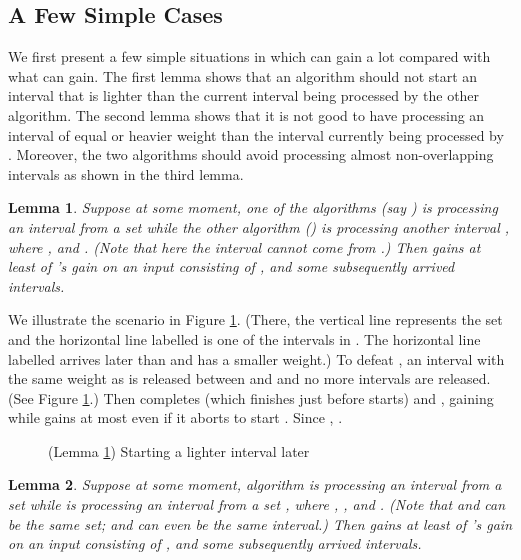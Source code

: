 \documentclass[11pt]{article}
\newtheorem{lemma}{Lemma}[section]
\newcommand{\qed}{\hspace*{\fill}\par\medskip}
\newenvironment{proof}{\noindent{\it Proof. }\ignorespaces}{\qed}
\begin{document}
\subsection{A Few Simple Cases}

We first present a few simple situations in which  can gain
a lot compared with what  can gain.
The first lemma shows that an algorithm should not start an interval
that is lighter than the current interval being processed by the
other algorithm.
The second lemma shows that it is not good to have
 processing an interval of equal or heavier weight
than the interval currently being processed by .
Moreover, the two algorithms should avoid processing
almost non-overlapping intervals
as shown in the third lemma.

\begin{lemma} \label{lem:YEarly}
Suppose at some moment,
one of the algorithms (say ) is processing
an interval  from a set 
while the other algorithm () is processing
another interval ,
where ,  and .
(Note that here the interval  cannot come from .)
Then  gains at least  of 's
gain on an input consisting of
,  and some subsequently arrived intervals.
\end{lemma}

\begin{proof}
We illustrate the scenario in Figure \ref{fig:yearly}.
(There, the vertical line represents the set  
and the horizontal line labelled  is one of the intervals
in .
The horizontal line labelled  arrives later than 
and has a smaller weight.)
To defeat , 
an interval  with the same weight as  is released
between  and 
and no more intervals are released.
(See Figure \ref{fig:yearly}.)
Then  completes  (which finishes just before  starts)
and , gaining  
while  gains at most  even if
it aborts  to start .
Since , .
\end{proof}

\begin{figure}
\centerline{ \epsfysize=0.9in  }
\caption{(Lemma \ref{lem:YEarly}) Starting a lighter interval later}
\label{fig:yearly}
\end{figure}

\begin{lemma} \label{lem:AHeavy}
Suppose at some moment, 
algorithm  is processing an interval  from
a set 
while  is processing an interval  from
a set ,
where , , 
and .
(Note that  and  can be the same set;
 and  can even be the same interval.)
Then  gains at least 
of 's gain on an input consisting of , 
and some subsequently arrived intervals.
\end{lemma}
\end{document}
